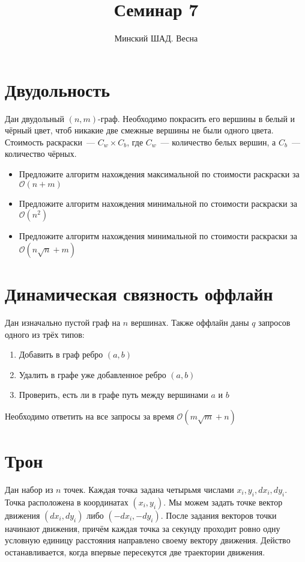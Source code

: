 \documentclass[addpoints]{exam}
\title{Семинар 7}
\author{Минский ШАД. Весна}
\begin{document}
\maketitle

\section{Двудольность}

Дан двудольный $(n,m)$-граф. Необходимо покрасить его вершины в белый и чёрный цвет, чтоб никакие две смежные вершины не были одного цвета. Стоимость раскраски~--- $C_w \times C_b$, где $C_w$~--- количество белых вершин, а $C_b$~--- количество чёрных.

\begin{itemize}
\item Предложите алгоритм нахождения максимальной по стоимости раскраски за $\mathcal{O}(n + m)$
\item Предложите алгоритм нахождения минимальной по стоимости раскраски за $\mathcal{O}(n^2)$
\item Предложите алгоритм нахождения минимальной по стоимости раскраски за $\mathcal{O}(n \sqrt{n} + m)$

\end{itemize}

\section{Динамическая связность оффлайн}

Дан изначально пустой граф на $n$ вершинах. Также оффлайн даны $q$ запросов одного из трёх типов:

\begin{enumerate}
\item Добавить в граф ребро $(a,b)$
\item Удалить в графе уже добавленное ребро $(a,b)$
\item Проверить, есть ли в графе путь между вершинами $a$ и $b$
\end{enumerate}

Необходимо ответить на все запросы за время $\mathcal{O}(m \sqrt{m} + n)$

\section{Трон}

Дан набор из $n$ точек. Каждая точка задана четырьмя числами $x_i, y_i, dx_i, dy_i$. Точка расположена в координатах $(x_i,y_i)$. Мы можем задать точке вектор движения $(dx_i, dy_i)$ либо $(-dx_i, -dy_i)$. После задания векторов точки начинают движения, причём каждая точка за секунду проходит ровно одну условную единицу расстояния направлено своему вектору движения. Действо останавливается, когда впервые пересекутся две траектории движения.
\end{document}
